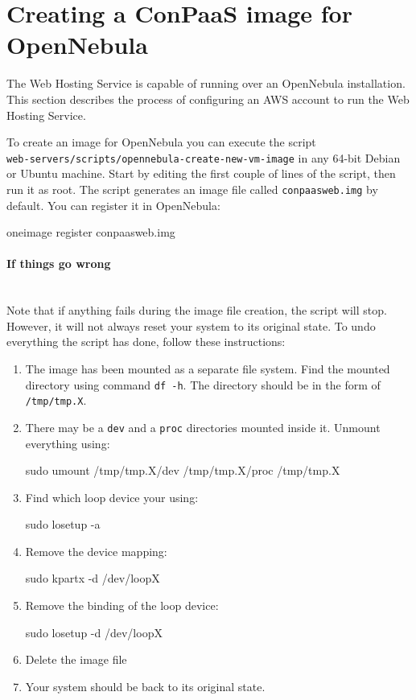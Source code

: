 \documentclass[10pt]{article}
\begin{document}
\section{Creating a ConPaaS image for OpenNebula}

The Web Hosting Service is capable of running over an OpenNebula
installation. This section describes the process of configuring an AWS
account to run the Web Hosting Service.

To create an image for OpenNebula you can execute the script\\
\verb+web-servers/scripts/opennebula-create-new-vm-image+ in any
64-bit Debian or Ubuntu machine. Start by editing the first couple of
lines of the script, then run it as root. The script generates an
image file called \verb+conpaasweb.img+ by default. You can register
it in OpenNebula:

\begin{code}
  oneimage register conpaasweb.img
\end{code}

\paragraph{If things go wrong}~\\

Note that if anything fails during the image file creation, the script
will stop. However, it will not always reset your system to its
original state. To undo everything the script has done, follow these
instructions:

\begin{enumerate}
\item The image has been mounted as a separate file system. Find the
  mounted directory using command \verb+df -h+. The directory should
  be in the form of \verb+/tmp/tmp.X+.
  
\item There may be a \verb+dev+ and a \verb+proc+ directories mounted
  inside it. Unmount everything using:
  \begin{code}
    sudo umount /tmp/tmp.X/dev /tmp/tmp.X/proc /tmp/tmp.X
  \end{code}
  
\item Find which loop device your using:
  \begin{code}
    sudo losetup -a
  \end{code}
  
\item Remove the device mapping:
  \begin{code}
    sudo kpartx -d /dev/loopX
  \end{code}
  
\item Remove the binding of the loop device:
  \begin{code}
    sudo losetup -d /dev/loopX
  \end{code}

\item Delete the image file 

\item Your system should be back to its original state.
\end{enumerate}
\end{document}
